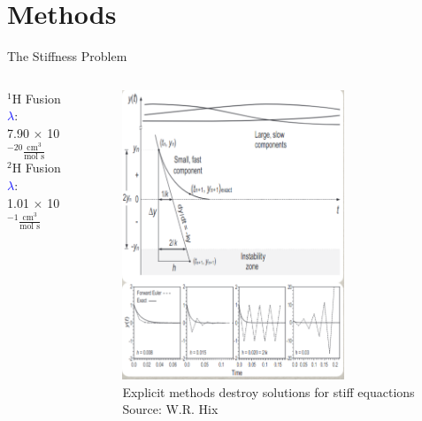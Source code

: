 \section{Methods}
\begin{frame}{The Stiffness Problem}
    \begin{columns}
        \begin{column}{0.4\textwidth}
        \Large
            $^1$H Fusion \textcolor{blue}{$\lambda$}: \\ 7.90 $\times$ 10$^{-20} \frac{\mathrm{cm}^3}{\text{mol s}}$\\ \vspace{20pt}
            $^2$H Fusion \textcolor{blue}{$\lambda$}: \\ 1.01 $\times$ 10$^{-1} \frac{\mathrm{cm}^3}{\text{mol s}}$
        \end{column}
        \begin{column}{0.6\textwidth}
            \begin{figure}
                \centering
                \includegraphics[width = 0.75\textwidth]{figs/hix.png}
                \caption{ Explicit methods destroy solutions for stiff equactions \\Source: W.R. Hix}
                \label{fig:enter-label}
            \end{figure}
        \end{column}
    \end{columns}
\end{frame}
